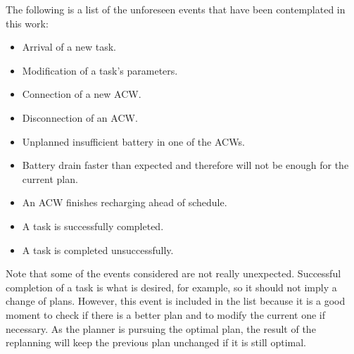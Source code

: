 The following is a list of the unforeseen events that have been contemplated in this work:

\begin{itemize}
    \item Arrival of a new task.
    \item Modification of a task's parameters.
    \item Connection of a new \gls{ACW}.
    \item Disconnection of an \gls{ACW}.
    \item Unplanned insufficient battery in one of the \glspl{ACW}.
    \item Battery drain faster than expected and therefore will not be enough for the current plan.
    \item An \gls{ACW} finishes recharging ahead of schedule.
    \item A task is successfully completed.
    \item A task is completed unsuccessfully.
\end{itemize}

Note that some of the events considered are not really unexpected. Successful completion of a task is what is desired, for example, so it should not imply a change of plans. However, this event is included in the list because it is a good moment to check if there is a better plan and to modify the current one if necessary. As the planner is pursuing the optimal plan, the result of the replanning will keep the previous plan unchanged if it is still optimal.